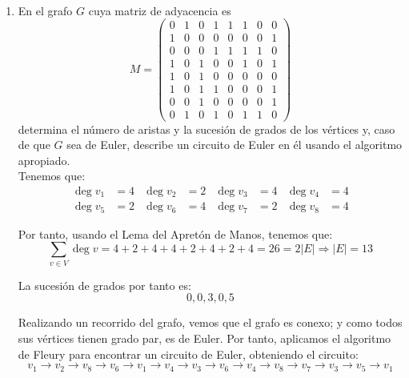 \begin{ejercicio}\label{ej:1.23}~
    \begin{enumerate}
        \item En el grafo $G$ cuya matriz de adyacencia es
        \[
            M=\begin{pmatrix}
                0 & 1 & 0 & 1 & 1 & 1 & 0 & 0 \\
                1 & 0 & 0 & 0 & 0 & 0 & 0 & 1 \\
                0 & 0 & 0 & 1 & 1 & 1 & 1 & 0 \\
                1 & 0 & 1 & 0 & 0 & 1 & 0 & 1 \\
                1 & 0 & 1 & 0 & 0 & 0 & 0 & 0 \\
                1 & 0 & 1 & 1 & 0 & 0 & 0 & 1 \\
                0 & 0 & 1 & 0 & 0 & 0 & 0 & 1 \\
                0 & 1 & 0 & 1 & 0 & 1 & 1 & 0
            \end{pmatrix}
        \]
        determina el número de aristas y la sucesión de grados de los vértices y, caso de que $G$ sea de Euler, describe un circuito de Euler en él usando el algoritmo apropiado.\\

        Tenemos que:
        \begin{align*}
            \deg v_1 &= 4 & \deg v_2 &= 2 & \deg v_3 &= 4 & \deg v_4 &= 4 \\
            \deg v_5 &= 2 & \deg v_6 &= 4 & \deg v_7 &= 2 & \deg v_8 &= 4
        \end{align*}

        Por tanto, usando el Lema del Apretón de Manos, tenemos que:
        \begin{equation*}
            \sum_{v\in V} \deg v = 4+2+4+4+2+4+2+4 = 26 = 2|E|
            \Longrightarrow |E| = 13
        \end{equation*}

        La sucesión de grados por tanto es:
        \begin{equation*}
            0,0,3,0,5
        \end{equation*}

        Realizando un recorrido del grafo, vemos que el grafo es conexo; y como todos sus vértices tienen grado par, es de Euler. Por tanto, aplicamos el algoritmo de Fleury para encontrar un circuito de Euler, obteniendo el circuito:
        \begin{equation*}
            v_1\to v_2\to v_8\to v_6\to v_1\to v_4\to v_3\to v_6\to v_4\to v_8\to v_7\to v_3\to v_5\to v_1
        \end{equation*}
        

\end{enumerate}
\end{ejercicio}
